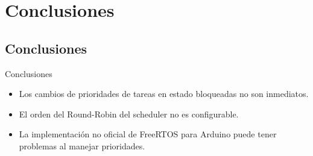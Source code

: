 \section{Conclusiones}

\subsection{Conclusiones}
\begin{frame}
	\begin{block}{Conclusiones}
		\begin{itemize}
			\item Los cambios de prioridades de tareas en estado bloqueadas no son inmediatos.
			\item El orden del Round-Robin del scheduler no es configurable.
			\item La implementación no oficial de FreeRTOS para Arduino puede tener problemas al manejar prioridades.
		\end{itemize}
	\end{block}
\end{frame}